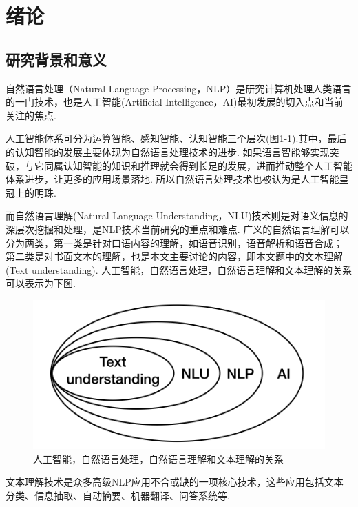 \documentclass[bachelor,winfonts]{jnuthesis}
\begin{document}
\tableofcontents

\mainmatter


\chapter{绪论}\label{chapter_introduction}
\section{研究背景和意义}
自然语言处理（Natural Language Processing，NLP）是研究计算机处理人类语言的一门技术，也是人工智能(Artificial Intelligence，AI)最初发展的切入点和当前关注的焦点.

人工智能体系可分为运算智能、感知智能、认知智能三个层次(图1-1).其中，最后的认知智能的发展主要体现为自然语言处理技术的进步.
如果语言智能够实现突破，与它同属认知智能的知识和推理就会得到长足的发展，进而推动整个人工智能体系进步，让更多的应用场景落地.
所以自然语言处理技术也被认为是人工智能皇冠上的明珠.

而自然语言理解(Natural Language Understanding，NLU)技术则是对语义信息的深层次挖掘和处理，是NLP技术当前研究的重点和难点.
广义的自然语言理解可以分为两类，第一类是针对口语内容的理解，如语音识别，语音解析和语音合成；
第二类是对书面文本的理解，也是本文主要讨论的内容，即本文题中的文本理解(Text understanding).
人工智能，自然语言处理，自然语言理解和文本理解的关系可以表示为下图.

\begin{figure}[h!]
  \centering
  \includegraphics[width=0.5\linewidth]{结构关系.png}
  \caption{人工智能，自然语言处理，自然语言理解和文本理解的关系}
\end{figure}

文本理解技术是众多高级NLP应用不合或缺的一项核心技术，这些应用包括文本分类、信息抽取、自动摘要、机器翻译、问答系统等.
\end{document}
